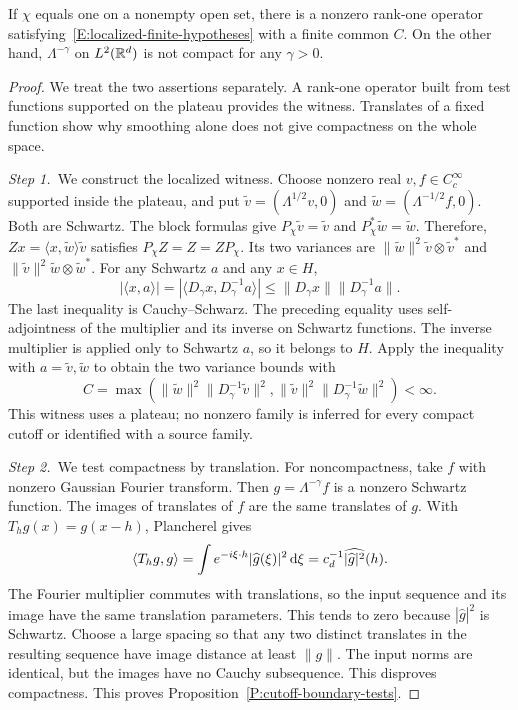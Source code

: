 \begin{proposition}\label{P:cutoff-boundary-tests}
  If $\chi$ equals one on a nonempty open set, there is a nonzero rank-one
  operator satisfying~\eqref{E:localized-finite-hypotheses} with a finite common
  $C$. On the other hand, $\Lambda^{-\gamma}$ on $L^2(\mathbb{R}^d)$ is not compact for
  any $\gamma > 0$.
\end{proposition}

\begin{proof}
  We treat the two assertions separately. A rank-one operator built from test
  functions supported on the plateau provides the witness. Translates of a
  fixed function show why smoothing alone does not give compactness on the
  whole space.

  \medskip
  \noindent\textit{Step 1.~}We construct the localized witness.
  Choose nonzero real $v,f \in C_c^\infty$ supported inside the plateau, and put
  $\widetilde{v} = (\Lambda^{1/2}v,0)$ and $\widetilde{w} =
  (\Lambda^{-1/2}f,0)$. Both are Schwartz. The block formulas give
  $P_\chi\widetilde{v} = \widetilde{v}$ and $P_\chi^*\widetilde{w} =
  \widetilde{w}$. Therefore, $Zx = \langle x,\widetilde{w}\rangle\widetilde{v}$
  satisfies $P_\chi Z = Z = ZP_\chi$. Its two variances are
  $\|\widetilde{w}\|^2\widetilde{v}\otimes\widetilde{v}^*$ and
  $\|\widetilde{v}\|^2\widetilde{w}\otimes\widetilde{w}^*$. For any Schwartz $a$
  and any $x \in H$,
  \[
    |\langle x,a\rangle|
    =|\langle D_\gamma x,D_\gamma^{-1}a\rangle|
    \le\|D_\gamma x\|\|D_\gamma^{-1}a\|.
  \]
  The last inequality is Cauchy--Schwarz. The preceding equality uses
  self-adjointness of the multiplier and its inverse on Schwartz functions.
  The inverse multiplier is applied only to Schwartz $a$, so it belongs to $H$.
  Apply the inequality with $a = \widetilde{v},\widetilde{w}$ to obtain the two
  variance bounds with
  \[
    C=\max\left(
    \|\widetilde{w}\|^2\|D_\gamma^{-1}\widetilde{v}\|^2,
    \|\widetilde{v}\|^2\|D_\gamma^{-1}\widetilde{w}\|^2\right)<\infty.
  \]
  This witness uses a plateau; no nonzero family is inferred for every compact
  cutoff or identified with a source family.

  \medskip
  \noindent\textit{Step 2.~}We test compactness by translation.
  For noncompactness, take $f$ with nonzero Gaussian Fourier transform. Then $g
  = \Lambda^{-\gamma}f$ is a nonzero Schwartz function. The images of translates
  of $f$ are the same translates of $g$. With $T_hg(x) = g(x-h)$, Plancherel
  gives
  \[
    \langle T_hg,g\rangle
    =\int e^{-i\xi\cdot h}|\widehat{g}(\xi)|^2\,\mathrm{d}\xi
    =c_d^{-1}\widehat{|\widehat{g}|^2}(h).
  \]
  The Fourier multiplier commutes with translations, so the input
  sequence and its image have the same translation parameters.
  This tends to zero because $|\widehat{g}|^2$ is Schwartz. Choose a large
  spacing so that any two distinct translates in the resulting sequence have
  image distance at least $\|g\|$. The input norms are identical, but the images
  have no Cauchy subsequence. This disproves compactness. This proves
  Proposition~\ref{P:cutoff-boundary-tests}.
\end{proof}

